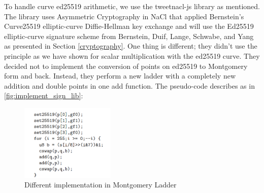 To handle curve ed25519 arithmetic, we use the tweetnacl-js library as mentioned. The library uses Asymmetric Cryptography in NaCl that applied Bernstein's Curve25519 elliptic-curve Diffie-Hellman key exchange and will use the Ed25519 elliptic-curve signature scheme from Bernstein, Duif, Lange, Schwabe, and Yang as presented in Section \ref{cryptography}. One thing is different; they didn’t use the principle as we have shown for scalar multiplication with the ed25519 curve. They decided not to implement the conversion of points on ed25519 to Montgomery form and back. Instead, they perform a new ladder with a completely new addition and double points in one add function. The pseudo-code describes as in \autoref{fig:implement_sign_lib}:
\begin{figure}[ht!]
    \centering
    \includegraphics[width=0.4\textwidth]{images/signnaclpart.png}
    \caption[Different implementation in Montgomery Ladder]{Different implementation in Montgomery Ladder}
    \label{fig:implement_sign_lib}
\end{figure}

